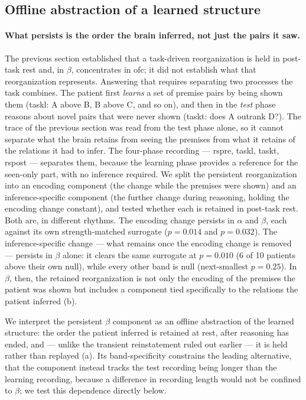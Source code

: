 %
    \subsection{Offline abstraction of a learned structure}
        \label{ssec:abstraction}
%
\paragraph{What persists is the order the brain inferred, not just the pairs it saw.}
The previous section established that a task-driven reorganization is held in post-task rest and, in \(\beta\), concentrates in \gls{ofc}; it did not establish what that reorganization represents. Answering that requires separating two processes the task combines. The patient first \emph{learns} a set of premise pairs by being shown them (\acrshort{taskl}: A above B, B above C, and so on), and then in the \emph{test} phase reasons about novel pairs that were never shown (\acrshort{taskt}: does A outrank D?). The trace of the previous section was read from the test phase alone, so it cannot separate what the brain retains from seeing the premises from what it retains of the relations it had to infer. The four-phase recording --- \acrshort{rspre}, \acrshort{taskl}, \acrshort{taskt}, \acrshort{rspost} --- separates them, because the learning phase provides a reference for the seen-only part, with no inference required. We split the persistent reorganization into an encoding component (the change while the premises were shown) and an inference-specific component (the further change during reasoning, holding the encoding change constant), and tested whether each is retained in post-task rest. Both are, in different rhythms. The encoding change persists in \(\alpha\) and \(\beta\), each against its own strength-matched surrogate (\(p = 0.014\) and \(p = 0.032\)). The inference-specific change --- what remains once the encoding change is removed --- persists in \(\beta\) alone: it clears the same surrogate at \(p = 0.010\) (6 of 10 patients above their own null), while every other band is null (next-smallest \(p = 0.25\)). In \(\beta\), then, the retained reorganization is not only the encoding of the premises the patient was shown but includes a component tied specifically to the relations the patient inferred (b).

We interpret the persistent \(\beta\) component as an offline abstraction of the learned structure: the order the patient inferred is retained at rest, after reasoning has ended, and --- unlike the transient reinstatement ruled out earlier --- it is held rather than replayed (a). Its band-specificity constrains the leading alternative, that the component instead tracks the test recording being longer than the learning recording, because a difference in recording length would not be confined to \(\beta\); we test this dependence directly below.

